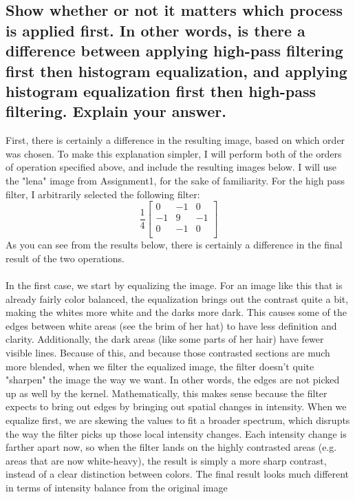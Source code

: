 \documentclass[11pt]{article}
\begin{document}
\subsection{Show whether or not it matters which process is applied first. In other words, is there a difference between applying high-pass filtering first then histogram equalization, and applying histogram equalization first then high-pass filtering. Explain your answer.}
First, there is certainly a difference in the resulting image, based on which order was chosen. To make this explanation simpler, I will perform both of the orders of operation specified above, and include the resulting images below. I will use the "lena" image from Assignment1, for the sake of familiarity. For the high pass filter, I arbitrarily selected the following filter:
\[
\frac{1}{4}
\begin{bmatrix}
0 & -1 & 0\\
-1 & 9 & -1\\
0 & -1 & 0\\
\end{bmatrix}
\]
As you can see from the results below, there is certainly a difference in the final result of the two operations.\\
\\
In the first case, we start by equalizing the image. For an image like this that is already fairly color balanced, the equalization brings out the contrast quite a bit, making the whites more white and the darks more dark. This causes some of the edges between white areas (see the brim of her hat) to have less definition and clarity. Additionally, the dark areas (like some parts of her hair) have fewer visible lines. Because of this, and because those contrasted sections are much more blended, when we filter the equalized image, the filter doesn't quite "sharpen" the image the way we want. In other words, the edges are not picked up as well by the kernel. Mathematically, this makes sense because the filter expects to bring out edges by bringing out spatial changes in intensity. When we equalize first, we are skewing the values to fit a broader spectrum, which disrupts the way the filter picks up those local intensity changes. Each intensity change is farther apart now, so  when the filter lands on the highly contrasted areas (e.g. areas that are now white-heavy), the result is simply a more sharp contrast, instead of a clear distinction between colors. The final result looks much different in terms of intensity balance from the original image\\
\end{document}

